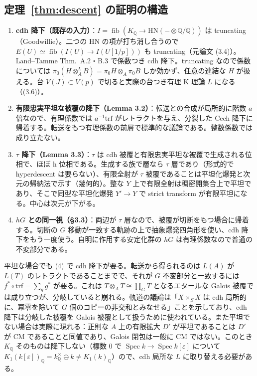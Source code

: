 \documentclass[11pt,a4paper]{ltjsarticle}
\numberwithin{equation}{section}
\theoremstyle{plain}
\theoremstyle{definition}
\theoremstyle{definition}
\newcommand{\Spec}{\operatorname{Spec}}
\newcommand{\Q}{\mathbb{Q}}
\begin{document}
\subsection{定理~\ref{thm:descent} の証明の構造}
\begin{enumerate}[label=(\arabic*)]
  \item \textbf{cdh 降下（既存の入力）}：$I=\operatorname{fib}(K_\Q\to\mathrm{HN}(-\otimes\Q/\Q))$ は truncating（Goodwillie）。二つの $\mathrm{HN}$ の項が打ち消し合うので $E(U)\simeq\operatorname{fib}(I(U)\to I(U[1/p]))$ も truncating（元論文 (3.4)）。Land--Tamme Thm.~A.2・B.3 で係数つき cdh 降下。truncating なので係数については $\pi_0(H\otimes^L_AB)=\pi_0H\otimes_A\pi_0B$ しか効かず、任意の連結な $H$ が扱える。台 $V(J)\subset V(p)$ で切ると実際の台つき有理 K 理論 $L$ になる（(3.6)）。
  \item \textbf{有限忠実平坦な被覆の降下（Lemma 3.2）}：転送との合成が局所的に階数 $a$ 倍なので、有理係数では $a^{-1}\mathrm{trf}$ がレトラクトを与え、分裂した Cech 降下に帰着する。転送をもつ有理係数の前層で標準的な議論である。整数係数では成り立たない。
  \item \textbf{$\tau$ 降下（Lemma 3.3）}：$\tau$ は cdh 被覆と有限忠実平坦な被覆で生成される位相で、ほぼ h 位相である。生成する族で層なら $\tau$ 層であり（形式的で hyperdescent は要らない）、有限全射が $\tau$ 被覆であることは平坦化爆発と次元の帰納法で示す（幾何的）。整な $Y$ 上で有限全射は稠密開集合上で平坦であり、そこで同型な平坦化爆発 $Y'\to Y$ で strict transform が有限平坦になる。中心は次元が下がる。
  \item \textbf{$hG$ との同一視（§3.3）}：両辺が $\tau$ 層なので、被覆が切断をもつ場合に帰着する。切断の $G$ 移動が一致する軌跡の上で抽象爆発四角形を使い、cdh 降下をもう一度使う。自明に作用する安定化群の $hG$ は有理係数なので普通の不変部分である。
\end{enumerate}
平坦な場合でも (4) で cdh 降下が要る。転送から得られるのは $L(A)$ が $L(T)$ のレトラクトであることまでで、それが $G$ 不変部分と一致するには $f^*\circ\mathrm{trf}=\sum_gg^*$ が要る。これは $T\otimes_AT\cong\prod_GT$ となるエタールな Galois 被覆では成り立つが、分岐していると崩れる。軌道の議論は「$X\times_SX$ は cdh 局所的に、冪零を除いて $G$ 個のコピーの非交和とみなせる」ことを示しており、cdh 降下は分岐した被覆を Galois 被覆として扱うために使われている。また平坦でない場合は実際に現れる：正則な $A$ 上の有限拡大 $D'$ が平坦であることは $D'$ が CM であることと同値であり、Galois 閉包は一般に CM ではない。このとき $K_\Q$ そのものは降下しない（標数 $0$ で $\Spec k\to\Spec k[\varepsilon]$ について $K_1(k[\varepsilon])_\Q=k^\times_\Q\oplus k\neq K_1(k)_\Q$）ので、cdh 局所な $L$ に取り替える必要がある。
\end{document}

